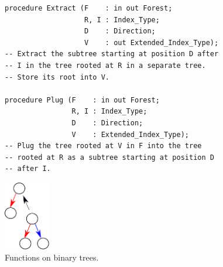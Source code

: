 \documentclass{llncs}
\begin{document}
\begin{figure}[ht]
\begin{minipage}[c]{.75\linewidth}
\begin{small}
\begin{lstlisting}
procedure Extract (F    : in out Forest;
                   R, I : Index_Type;
                   D    : Direction;
                   V    : out Extended_Index_Type);
-- Extract the subtree starting at position D after
-- I in the tree rooted at R in a separate tree.
-- Store its root into V.

procedure Plug (F    : in out Forest;
                R, I : Index_Type;
                D    : Direction;
                V    : Extended_Index_Type);
-- Plug the tree rooted at V in F into the tree
-- rooted at R as a subtree starting at position D
-- after I.
\end{lstlisting}
\end{small}
\end{minipage} \hfill
\begin{minipage}[c]{.23\linewidth}
\includegraphics[width=2cm]{plug.pdf}
\end{minipage}
\caption{\label{fig-binary-fun} Functions on binary trees.}
\end{figure}



\end{document}
